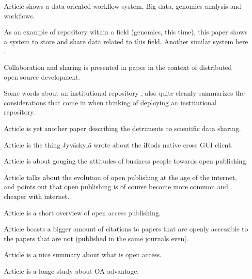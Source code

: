 Article \cite{DBLP:conf/bcb/PiredduLSZ14} shows a data oriented workflow
system. Big data, genomics analysis and workflows.

As an example of repository within a field (genomics, this time), this paper
\cite{craigon2004nascarrays} shows a system to store and share data related
to this field. Another similar system here \cite{DBLP:journals/nar/EdgarDL03}.

Collaboration and sharing is presented in paper \cite{craigon2004nascarrays} in
the context of distributed open source development.

Some words about an institutional repository \cite{gibbons2009benefits}, also
quite cleanly summarizes the considerations that come in when thinking of
deploying an institutional repository.

Article \cite{DBLP:conf/icegov/SayogoP11} is yet another paper describing
the detriments to scientific data sharing.

Article \cite{irodsinproceedings} is the thing Jyväskylä wrote about the iRods
native cross GUI client.

Article \cite{DBLP:conf/elpub/Hedlund08} is about gouging the attitudes of
business people towards open publishing.

Article \cite{laakso2011development} talks about the evolution of open
publishing at the age of the internet, and points out that open publishing
is of course become more common and cheaper with internet.

Article \cite{suber2007open} is a short overview of open access publishing.

Article \cite{harnad2004comparing} boasts a bigger amount of citations to
papers that are openly accessible to the papers that are not (published in the
same journals even).

Article \cite{bailey2008open} is a nice summary about what is open access.

Article \cite{DBLP:journals/corr/abs-cs-0606079} is a longe study about OA
advantage.
